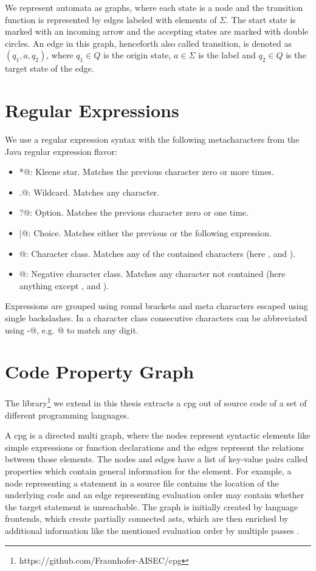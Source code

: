 We represent automata as graphs, where each state is a node and the transition function is represented by edges labeled with elements of $\Sigma$. The start state is marked with an incoming arrow and the accepting states are marked with double circles.
An edge in this graph, henceforth also called transition, is denoted as $(q_1, a, q_2)$, where $q_1 \in Q$ is the origin state, $a \in \Sigma$ is the label and $q_2 \in Q$ is the target state of the edge.

\section{Regular Expressions}\label{sec:background:regex}

We use a regular expression syntax with the following metacharacters from the Java regular expression flavor:

\begin{itemize}
	\item \Verb@*@: Kleene star. Matches the previous character zero or more times.
	\item \Verb@.@: Wildcard. Matches any character.
	\item \Verb@?@: Option. Matches the previous character zero or one time.
	\item \Verb@|@: Choice. Matches either the previous or the following expression.
	\item \Verb@[abc]@: Character class. Matches any of the contained characters (here \Verb@a@, \Verb@b@ and \Verb@c@).
	\item \Verb@[^abc]@: Negative character class. Matches any character not contained (here anything except \Verb@a@, \Verb@b@ and \Verb@c@).
\end{itemize}

Expressions are grouped using round brackets and meta characters escaped using single backslashes.
In a character class consecutive characters can be abbreviated using \Verb@-@, e.g. \Verb@[0-9]@ to match any digit.

\section{Code Property Graph}\label{sec:background:cpg}
The library\footnote{https://github.com/Fraunhofer-AISEC/cpg} we extend in this thesis extracts a \acf{cpg} out of source code of a set of different programming languages.

A \ac{cpg} is a directed multi graph, where the nodes represent syntactic elements like simple expressions or function declarations and the edges represent the relations between those elements. The nodes and edges have a list of key-value pairs called properties which contain general information for the element. For example, a node representing a statement in a source file contains the location of the underlying code and an edge representing evaluation order may contain whether the target statement is unreachable. The graph is initially created by language frontends, which create partially connected \acp{ast}, which are then enriched by additional information like the mentioned evaluation order by multiple passes \cite{cpg}.

